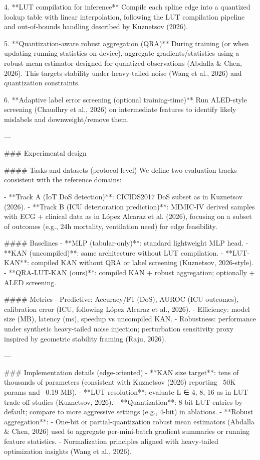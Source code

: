 4. **LUT compilation for inference**  
   Compile each spline edge into a quantized lookup table with linear interpolation, following the LUT compilation pipeline and out-of-bounds handling described by Kuznetsov (2026).

5. **Quantization-aware robust aggregation (QRA)**  
   During training (or when updating running statistics on-device), aggregate gradients/statistics using a robust mean estimator designed for quantized observations (Abdalla & Chen, 2026). This targets stability under heavy-tailed noise (Wang et al., 2026) and quantization constraints.

6. **Adaptive label error screening (optional training-time)**  
   Run ALED-style screening (Chaudhry et al., 2026) on intermediate features to identify likely mislabels and downweight/remove them.

---

### Experimental design  

#### Tasks and datasets (protocol-level)  
We define two evaluation tracks consistent with the reference domains:

- **Track A (IoT DoS detection)**: CICIDS2017 DoS subset as in Kuznetsov (2026).  
- **Track B (ICU deterioration prediction)**: MIMIC-IV derived samples with ECG + clinical data as in López Alcaraz et al. (2026), focusing on a subset of outcomes (e.g., 24h mortality, ventilation need) for edge feasibility.

#### Baselines  
- **MLP (tabular-only)**: standard lightweight MLP head.  
- **KAN (uncompiled)**: same architecture without LUT compilation.  
- **LUT-KAN**: compiled KAN without QRA or label screening (Kuznetsov, 2026-style).  
- **QRA-LUT-KAN (ours)**: compiled KAN + robust aggregation; optionally + ALED screening.

#### Metrics  
- Predictive: Accuracy/F1 (DoS), AUROC (ICU outcomes), calibration error (ICU, following López Alcaraz et al., 2026).  
- Efficiency: model size (MB), latency (ms), speedup vs uncompiled KAN.  
- Robustness: performance under synthetic heavy-tailed noise injection; perturbation sensitivity proxy inspired by geometric stability framing (Raju, 2026).

---

### Implementation details (edge-oriented)  
- **KAN size target**: tens of thousands of parameters (consistent with Kuznetsov (2026) reporting ~50K params and ~0.19 MB).  
- **LUT resolution**: evaluate L ∈ {4, 8, 16} as in LUT trade-off studies (Kuznetsov, 2026).  
- **Quantization**: 8-bit LUT entries by default; compare to more aggressive settings (e.g., 4-bit) in ablations.  
- **Robust aggregation**:  
  - One-bit or partial-quantization robust mean estimators (Abdalla & Chen, 2026) used to aggregate per-mini-batch gradient summaries or running feature statistics.  
  - Normalization principles aligned with heavy-tailed optimization insights (Wang et al., 2026).

